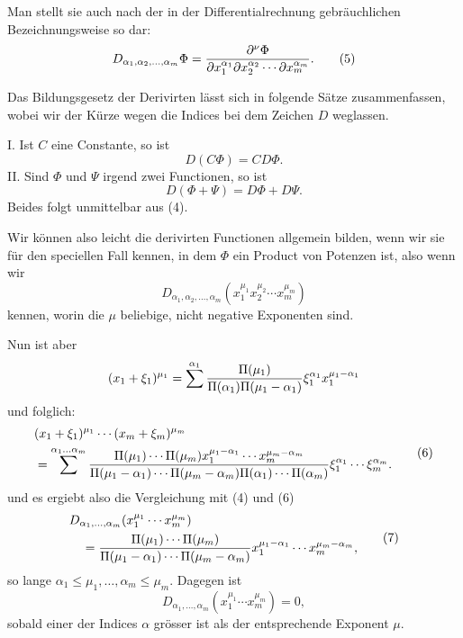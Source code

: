 \documentclass[11pt]{article}
\begin{document}
Man stellt sie auch nach der in der Differentialrechnung gebräuchlichen Bezeichnungsweise so dar:
\begin{equation}
 D_{\alpha_1,\alpha_2,\ldots,\alpha_m}\Phi
 =
 {\partial^\nu\Phi\over
 \partial x_1^{\alpha_1}\partial x_2^{\alpha_2}\cdots\partial x_m^{\alpha_m}}.
\tag{5}
\end{equation}

Das Bildungsgesetz der Derivirten lässt sich in folgende Sätze zusammenfassen, wobei wir der Kürze wegen die Indices bei dem Zeichen $D$ weglassen.

I. Ist $C$ eine Constante, so ist
\[
 D(C\Phi)=CD\Phi.
\]
II. Sind $\Phi$ und $\Psi$ irgend zwei Functionen, so ist
\[
 D(\Phi+\Psi)=D\Phi+D\Psi.
\]
Beides folgt unmittelbar aus (4).

Wir können also leicht die derivirten Functionen allgemein bilden, wenn wir sie für den speciellen Fall kennen, in dem $\Phi$ ein Product von Potenzen ist, also wenn wir
\[
 D_{\alpha_1,\alpha_2,\ldots,\alpha_m}(x_1^{\mu_1}x_2^{\mu_2}\cdots x_m^{\mu_m})
\]
kennen, worin die $\mu$ beliebige, nicht negative Exponenten sind.

Nun ist aber
\[
 (x_1+\xi_1)^{\mu_1}
 =\sum^{\alpha_1}{\Pi(\mu_1)\over\Pi(\alpha_1)\Pi(\mu_1-\alpha_1)}
 \xi_1^{\alpha_1}x_1^{\mu_1-\alpha_1}
\]
und folglich:
\begin{equation}
\begin{aligned}
&(x_1+\xi_1)^{\mu_1}\cdots(x_m+\xi_m)^{\mu_m}\\
&=\sum^{\alpha_1\ldots\alpha_m}
 {\Pi(\mu_1)\cdots\Pi(\mu_m)x_1^{\mu_1-\alpha_1}\cdots x_m^{\mu_m-\alpha_m}
 \over
 \Pi(\mu_1-\alpha_1)\cdots\Pi(\mu_m-\alpha_m)\Pi(\alpha_1)\cdots\Pi(\alpha_m)}
 \xi_1^{\alpha_1}\cdots\xi_m^{\alpha_m}.
\end{aligned}
\tag{6}
\end{equation}
und es ergiebt also die Vergleichung mit (4) und (6)
\begin{equation}
\begin{aligned}
&D_{\alpha_1,\ldots,\alpha_m}(x_1^{\mu_1}\cdots x_m^{\mu_m})\\
&\quad =
{\Pi(\mu_1)\cdots\Pi(\mu_m)\over
 \Pi(\mu_1-\alpha_1)\cdots\Pi(\mu_m-\alpha_m)}
 x_1^{\mu_1-\alpha_1}\cdots x_m^{\mu_m-\alpha_m},
\end{aligned}
\tag{7}
\end{equation}
so lange $\alpha_1\leq\mu_1,\ldots,\alpha_m\leq\mu_m$. Dagegen ist
\begin{equation}
 D_{\alpha_1,\ldots,\alpha_m}(x_1^{\mu_1}\cdots x_m^{\mu_m})=0,
\tag{8}
\end{equation}
sobald einer der Indices $\alpha$ grösser ist als der entsprechende Exponent $\mu$.
\end{document}
